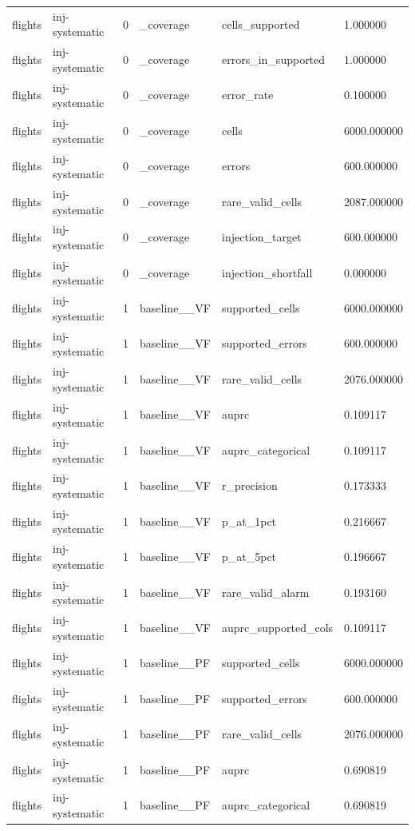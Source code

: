 \begin{tabular}{llllll}
flights & inj-systematic & 0 & \_coverage & cells\_supported & 1.000000 \\
flights & inj-systematic & 0 & \_coverage & errors\_in\_supported & 1.000000 \\
flights & inj-systematic & 0 & \_coverage & error\_rate & 0.100000 \\
flights & inj-systematic & 0 & \_coverage & cells & 6000.000000 \\
flights & inj-systematic & 0 & \_coverage & errors & 600.000000 \\
flights & inj-systematic & 0 & \_coverage & rare\_valid\_cells & 2087.000000 \\
flights & inj-systematic & 0 & \_coverage & injection\_target & 600.000000 \\
flights & inj-systematic & 0 & \_coverage & injection\_shortfall & 0.000000 \\
flights & inj-systematic & 1 & baseline\_\_VF & supported\_cells & 6000.000000 \\
flights & inj-systematic & 1 & baseline\_\_VF & supported\_errors & 600.000000 \\
flights & inj-systematic & 1 & baseline\_\_VF & rare\_valid\_cells & 2076.000000 \\
flights & inj-systematic & 1 & baseline\_\_VF & auprc & 0.109117 \\
flights & inj-systematic & 1 & baseline\_\_VF & auprc\_categorical & 0.109117 \\
flights & inj-systematic & 1 & baseline\_\_VF & r\_precision & 0.173333 \\
flights & inj-systematic & 1 & baseline\_\_VF & p\_at\_1pct & 0.216667 \\
flights & inj-systematic & 1 & baseline\_\_VF & p\_at\_5pct & 0.196667 \\
flights & inj-systematic & 1 & baseline\_\_VF & rare\_valid\_alarm & 0.193160 \\
flights & inj-systematic & 1 & baseline\_\_VF & auprc\_supported\_cols & 0.109117 \\
flights & inj-systematic & 1 & baseline\_\_PF & supported\_cells & 6000.000000 \\
flights & inj-systematic & 1 & baseline\_\_PF & supported\_errors & 600.000000 \\
flights & inj-systematic & 1 & baseline\_\_PF & rare\_valid\_cells & 2076.000000 \\
flights & inj-systematic & 1 & baseline\_\_PF & auprc & 0.690819 \\
flights & inj-systematic & 1 & baseline\_\_PF & auprc\_categorical & 0.690819 \\

\end{tabular}
